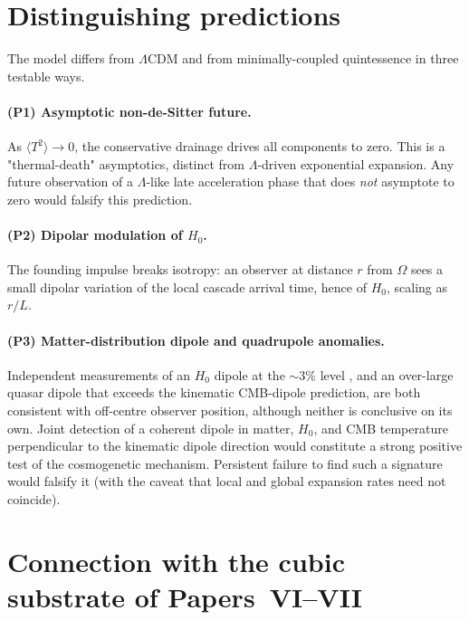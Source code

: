 \documentclass[11pt,a4paper]{article}
\begin{document}
\FloatBarrier
\section{Distinguishing predictions}
\label{sec:predictions}

The model differs from $\Lambda$CDM and from minimally-coupled
quintessence in three testable ways.

\paragraph{(P1) Asymptotic non-de-Sitter future.}
As $\langle T^2\rangle \to 0$, the conservative drainage drives all
components to zero. This is a "thermal-death" asymptotics, distinct
from $\Lambda$-driven exponential expansion. Any future observation of
a $\Lambda$-like late acceleration phase that does \emph{not}
asymptote to zero would falsify this prediction.

\paragraph{(P2) Dipolar modulation of $H_0$.}
The founding impulse breaks isotropy: an observer at distance $r$
from $\Omega$ sees a small dipolar variation of the local cascade
arrival time, hence of $H_0$, scaling as $r/L$.

\paragraph{(P3) Matter-distribution dipole and quadrupole anomalies.}
Independent measurements of an $H_0$ dipole at the $\sim 3\%$ level
\cite{boubel2024}, and an over-large quasar dipole \cite{secrest2021}
that exceeds the kinematic CMB-dipole prediction, are both consistent
with off-centre observer position, although neither is conclusive on
its own. Joint detection of a coherent dipole in matter,
$H_0$, and CMB temperature perpendicular to the kinematic dipole
direction would constitute a strong positive test of the cosmogenetic
mechanism. Persistent failure to find such a signature would falsify
it (with the caveat that local and global expansion rates need not
coincide).

\FloatBarrier
\section{Connection with the cubic substrate of Papers~VI--VII}
\label{sec:connection}
\end{document}

